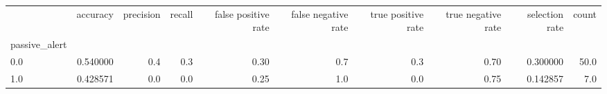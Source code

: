\begin{tabular}{lrrrrrrrrr}
\toprule
{} &  accuracy &  precision &  recall &  false positive rate &  false negative rate &  true positive rate &  true negative rate &  selection rate &  count \\
passive\_alert &           &            &         &                      &                      &                     &                     &                 &        \\
\midrule
0.0           &  0.540000 &        0.4 &     0.3 &                 0.30 &                  0.7 &                 0.3 &                0.70 &        0.300000 &   50.0 \\
1.0           &  0.428571 &        0.0 &     0.0 &                 0.25 &                  1.0 &                 0.0 &                0.75 &        0.142857 &    7.0 \\
\bottomrule
\end{tabular}
